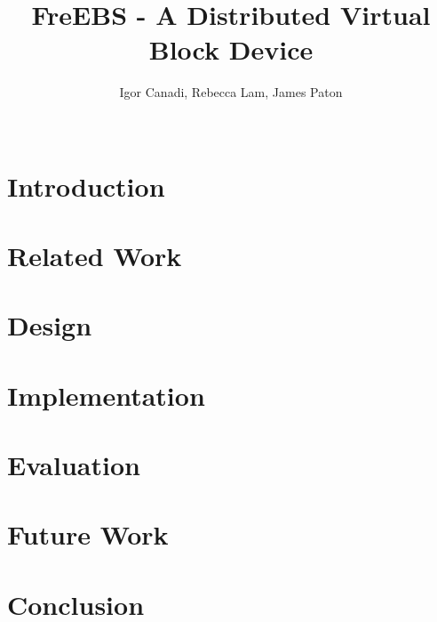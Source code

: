 \documentclass{sig-alternate-10pt}
\begin{document}
\title{FreEBS - A Distributed Virtual Block Device}

\author{
	\alignauthor Igor Canadi, Rebecca Lam, James Paton\\
	\\
}

\maketitle



\section{Introduction}
\label{sec:intro}


\section{Related Work}
\label{sec:related}


\section{Design}
\label{sec:design}


\section{Implementation}
\label{sec:implementation}


\section{Evaluation}
\label{sec:evaluation}


\section{Future Work}
\label{sec:future_work}


\section{Conclusion}
\label{sec:conc}




\end{document}
